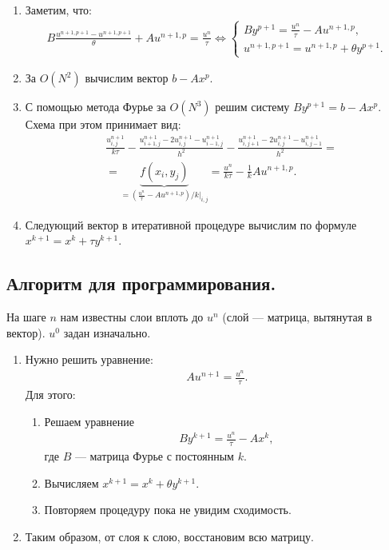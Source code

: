 \documentclass[14pt,a4paper]{extarticle}
\newcommand{\1}{\mathbbm{1}}
\begin{document}
\begin{enumerate}
    \item Заметим, что:
    \begin{align*}
        B \frac{u^{n+1, p+1} - u^{n+1, p+1}}{\theta} + A u^{n+1, p} 
        = \frac{u^{n}}{\tau}\Leftrightarrow 
        \left\{\begin{array}{l}
            B y^{p+1} = \frac{u^{n}}{\tau} - A u^{n+1, p}, \\
            u^{n+1, p+1} = u^{n+1, p} + \theta y^{p+1}.
        \end{array}\right.
    \end{align*}
    \item За $O(N^2)$ вычислим вектор $b - A x^p$.
    \item С помощью метода Фурье за $O(N^3)$ решим систему $B y^{p+1} = b - A x^p$. Схема при этом принимает вид:
\begin{align*}
    &\frac{u^{n+1}_{i,j}}{k \tau} - 
    \frac{u^{n+1}_{i+1, j} - 2 u^{n+1}_{i, j}- u^{n+1}_{i-1, j}}{h^2} -  
    \frac{u^{n+1}_{i, j+1} - 2 u^{n+1}_{i, j}- u^{n+1}_{i, j-1}}{h^2} =\\&= 
    \underbrace{f(x_i, y_j)}_{= (\frac{u^{n}}{\tau} - A u^{n+1, p})/k\big|_{i,j}} = \frac{u^{n}}{k\tau} - \frac{1}{k} A u^{n+1, p}.
\end{align*}

    \item Следующий вектор в итеративной процедуре вычислим по формуле $x^{k+1} = x^k + \tau y^{k+1}$.
\end{enumerate}
\subsection{Алгоритм для программирования.}
На шаге $n$ нам известны слои вплоть до $u^n$ (слой --- матрица, вытянутая в вектор). $u^0$ задан изначально. 
\begin{enumerate} 
    \item Нужно решить уравнение:
    \begin{align*}
        A u^{n+1} = \frac{u^n}{\tau}.
    \end{align*}
    Для этого:
    \begin{enumerate}
        \item Решаем уравнение 
        \begin{align*}
            B y^{k+1} = \frac{u^{n}}{\tau} - A x^k,
        \end{align*}
        где $B$ --- матрица Фурье с постоянным $k$.
        \item Вычисляем $x^{k+1}=x^k + \theta y^{k+1}$.
        \item Повторяем процедуру пока не увидим сходимость.
    \end{enumerate}
    \item Таким образом, от слоя к слою, восстановим всю матрицу.
\end{enumerate}
\end{document}
